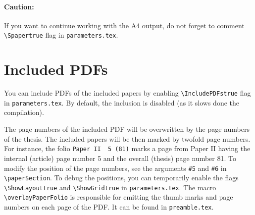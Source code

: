 \paragraph*{Caution:} If you want to continue working with the
A4 output, do not forget to comment \texttt{\textbackslash{}Spapertrue} 
flag in \texttt{parameters.tex}.

\section*{Included PDFs}

You can include PDFs of the included papers by enabling
\texttt{\textbackslash{}IncludePDFstrue} flag in \texttt{parameters.tex}.
By default, the inclusion is disabled (as it slows done the compilation).

The page numbers of the included PDF will be overwritten by
the page numbers of the thesis.
The included papers will be then marked by twofold page numbers. 
For instance,
the folio \texttt{Paper\,II\,\textendash \,5\,(81)} marks a page
from Paper II having the internal (article) page number 5 and the
overall (thesis) page number 81.
To modify the position of the page numbers, see the arguments 
\texttt{\#5} and \texttt{\#6} in \texttt{\textbackslash{}paperSection}.
To debug the positions, you can temporarily enable the flags
\texttt{\textbackslash{}ShowLayouttrue} and
\texttt{\textbackslash{}ShowGridtrue} in 
\texttt{parameters.tex}.
The macro \texttt{\textbackslash{}overlayPaperFolio} is responsible 
for emitting the thumb marks and page numbers on each page of the PDF. 
It can be found in \texttt{preamble.tex}.

